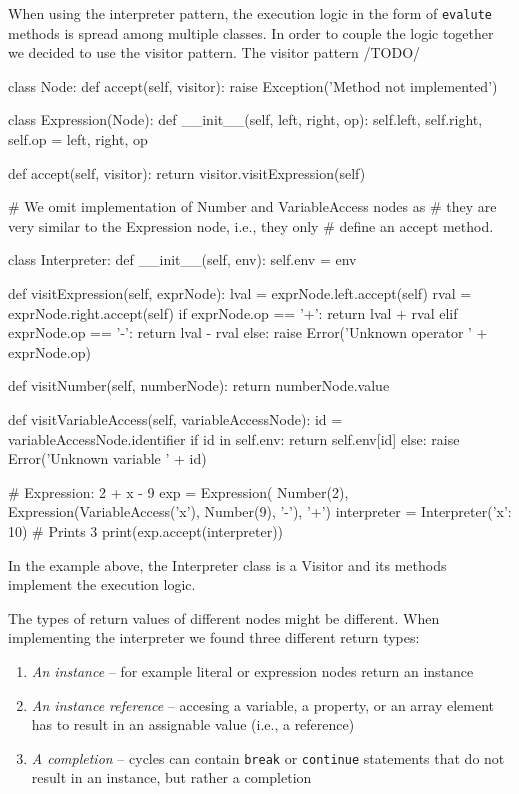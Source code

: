 When using the interpreter pattern, the execution logic in the form of \texttt{evalute} methods is spread among multiple classes. In order to couple the
logic together we decided to use the visitor pattern. The visitor pattern /TODO/
\begin{code}
class Node:
    def accept(self, visitor):
        raise Exception('Method not implemented')

class Expression(Node):
    def __init__(self, left, right, op):
        self.left, self.right, self.op = left, right, op

    def accept(self, visitor):
        return visitor.visitExpression(self)

# We omit implementation of Number and VariableAccess nodes as
# they are very similar to the Expression node, i.e., they only
# define an accept method.

class Interpreter:
    def __init__(self, env):
        self.env = env
    
    def visitExpression(self, exprNode):
        lval = exprNode.left.accept(self)
        rval = exprNode.right.accept(self)
        if exprNode.op == '+':
            return lval + rval
        elif exprNode.op == '-':
            return lval - rval
        else:
            raise Error('Unknown operator ' + exprNode.op)
    
    def visitNumber(self, numberNode):
        return numberNode.value
    
    def visitVariableAccess(self, variableAccessNode):
        id = variableAccessNode.identifier
        if id in self.env:
            return self.env[id]
        else:
            raise Error('Unknown variable ' + id)

# Expression: 2 + x - 9
exp = Expression(
    Number(2),
    Expression(VariableAccess('x'), Number(9), '-'),
    '+')
interpreter = Interpreter({'x': 10})
# Prints 3
print(exp.accept(interpreter))
\end{code}

In the example above, the Interpreter class is a Visitor and its methods implement the execution logic.

The types of return values of different nodes might be different. When implementing the interpreter we found three different return types:
\begin{enumerate}
    \item \emph{An instance} -- for example literal or expression nodes return an instance
    \item \emph{An instance reference} -- accesing a variable, a property, or an array element has to result in an assignable value (i.e., a reference)
    \item \emph{A completion} -- cycles can contain \texttt{break} or \texttt{continue} statements that do not result in an instance, but rather a completion
\end{enumerate} 

